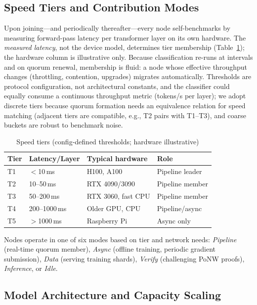 \documentclass[conference]{IEEEtran}
\begin{document}
\subsection{Speed Tiers and Contribution Modes}
\label{sec:tiers}

Upon joining---and periodically thereafter---every node self-benchmarks by measuring forward-pass latency per transformer layer on its own hardware. The \emph{measured latency}, not the device model, determines tier membership (Table~\ref{tab:tiers}); the hardware column is illustrative only. Because classification re-runs at intervals and on quorum renewal, membership is fluid: a node whose effective throughput changes (throttling, contention, upgrades) migrates automatically. Thresholds are protocol configuration, not architectural constants, and the classifier could equally consume a continuous throughput metric (tokens/s per layer); we adopt discrete tiers because quorum formation needs an equivalence relation for speed matching (adjacent tiers are compatible, e.g., T2 pairs with T1--T3), and coarse buckets are robust to benchmark noise.

\begin{table}[t]
\caption{Speed tiers (config-defined thresholds; hardware illustrative)}
\label{tab:tiers}
\centering
\begin{tabular}{@{}llll@{}}
\toprule
\textbf{Tier} & \textbf{Latency/Layer} & \textbf{Typical hardware} & \textbf{Role} \\
\midrule
T1 & $<$10\,ms & H100, A100 & Pipeline leader \\
T2 & 10--50\,ms & RTX 4090/3090 & Pipeline member \\
T3 & 50--200\,ms & RTX 3060, fast CPU & Pipeline member \\
T4 & 200--1000\,ms & Older GPU, CPU & Pipeline/async \\
T5 & $>$1000\,ms & Raspberry Pi & Async only \\
\bottomrule
\end{tabular}
\end{table}

Nodes operate in one of six modes based on tier and network needs: \emph{Pipeline} (real-time quorum member), \emph{Async} (offline training, periodic gradient submission), \emph{Data} (serving training shards), \emph{Verify} (challenging PoNW proofs), \emph{Inference}, or \emph{Idle}.

\subsection{Model Architecture and Capacity Scaling}
\label{sec:model}
\end{document}
